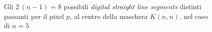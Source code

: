 \edf

\begin{figure}[tbp]
 \centerline{
  }
 \centerline{
  }
 \caption[Digital straight line segments]
  {Gli $2\,(n-1)=8$ possibili {\it digital straight line segments} distinti passanti per il
   pixel $p$, al centro della maschera $K(n,n)$, nel caso di $n=5$}
\end{figure}

\finepar
 





